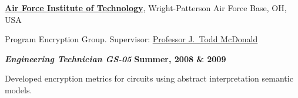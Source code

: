 \href{http://www.ll.mit.edu/}{\textbf{Air Force Institute of Technology}},
Wright-Patterson Air Force Base, OH, USA

Program Encryption Group.
Supervisor: 
\href{http://www.soc.southalabama.edu/~mcdonald/}
{Professor J.~Todd McDonald}
\vspace{-0.5em}
\begin{outerlist}

\vspace{-0.25em}

\item[] \textbf{\textit{Engineering Technician GS-05}}%
\hfill \textbf{Summer, 2008 \& 2009}

\vspace{-0.5em}

Developed encryption metrics for circuits using abstract interpretation semantic models.

\end{outerlist}
